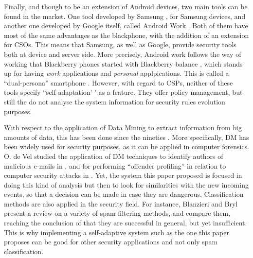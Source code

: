 \documentclass{sig-alternate}
\begin{document}
Finally, and though to be an extension of Android devices, two main tools can be found in the market. One tool developed by Samsung \cite{Samsung_tool}, for Samsung devices, and another one developed by Google itself, called Android Work \cite{AndroidWork_site}. Both of them have most of the same advantages as the blackphone, with the addition of an extension for CSOs. This means that Samsung, as well as Google, provide security tools both at device and server side. More precisely, Android work follows the way of working that Blackberry phones started with Blackberry balance \cite{Blackberry_tool}, which stands up for having \textit{work} applications and \textit{personal} applpications. This is called a ``dual-persona'' smartphone \cite{AndroidWork_review}. However, with regard to CSPs, neither of these tools specify ``self-adaptation' ' as a feature. They offer policy management, but still the do not analyse the system information for security rules evolution purposes.

With respect to the application of Data Mining to extract information from big amounts of data, this has been done since the nineties \cite{agrawal1995mining, ester1996density}. More specifically, DM has been widely used for security purposes, as it can be applied in computer forensics. O. de Vel studied the application of DM techniques to identify authors of malicious e-mails in \cite{DeVel2001}, and for performing ``offender profiling'' in relation to computer security attacks in \cite{abraham2002investigative}. Yet, the system this paper proposed is focused in doing this kind of analysis but then to look for similarities with the new incoming events, so that a decision can be made in case they are dangerous. Classification methods are also applied in the security field. For instance, Blanzieri and Bryl \cite{blanzieri2008} present a review on a variety of spam filtering methods, and compare them, reaching the conclusion of that they are successful in general, but yet insufficient. This is why implementing a self-adaptive system such as the one this paper proposes can be good for other security applications and not only spam classification.
\end{document}
